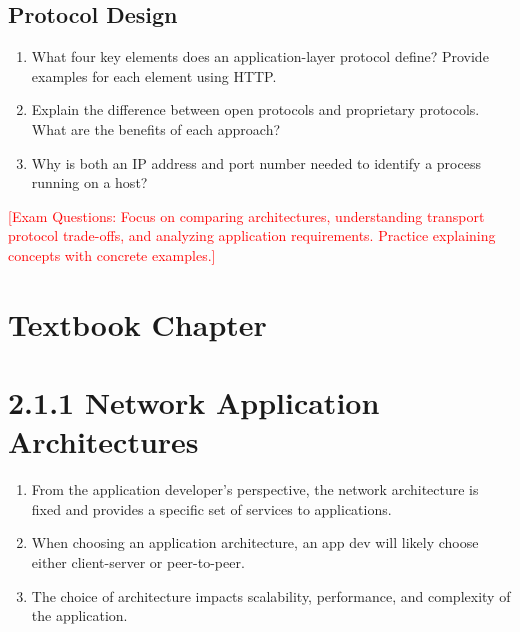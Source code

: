 \documentclass[12pt]{article}
\begin{document}
\subsection*{Protocol Design}
\begin{enumerate}
    \item What four key elements does an application-layer protocol define? Provide examples for each element using HTTP.
    \item Explain the difference between open protocols and proprietary protocols. What are the benefits of each approach?
    \item Why is both an IP address and port number needed to identify a process running on a host?
\end{enumerate}

\textcolor{red}{[Exam Questions: Focus on comparing architectures, understanding transport protocol trade-offs, and analyzing application requirements. Practice explaining concepts with concrete examples.]}


\section{Textbook Chapter}
\section{2.1.1 Network Application Architectures}
\begin{enumerate}
    \item From the application developer’s perspective, the network architecture is fixed and provides a specific set of services to applications.
    \item When choosing an application architecture, an app dev will likely choose either client-server or peer-to-peer.
    \item The choice of architecture impacts scalability, performance, and complexity of the application.
\end{enumerate}
\end{document}
